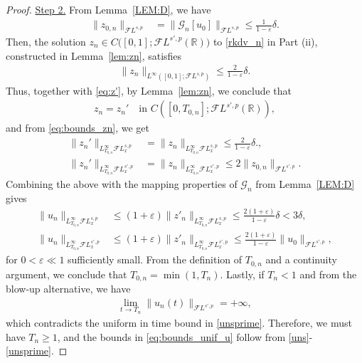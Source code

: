 \documentclass[a4paper,
11pt,  reqno]{amsart}
\newcommand{\5}{\textup{V}}
\newcommand{\FL}{\mathcal{F} L}
\newcommand{\dl}{\delta}
\newcommand{\eps}{\varepsilon}
\theoremstyle{remark}
\newcommand{\R}{\mathbb{R}}
\newcommand{\Gc}{\mathcal{G}}
\numberwithin{equation}{section}
\numberwithin{theorem}{section}
\begin{document}
\begin{proof}
\smallskip
\noindent\underline{Step 2.} From Lemma~\ref{LEM:D}, we have
\begin{align}
\| z_{0,n} \|_{\FL^{s,p}} &  = \| \Gc_n [ u_0] \|_{\FL^{s,p}} \le \tfrac{1}{1-\eps} \dl.
\end{align}
Then,
the solution $z_n \in C\big( [0,1]; \FL^{s',p}(\R)\big)$ to \eqref{rkdv_n} in Part (ii), constructed in Lemma~\ref{lem:zn}, satisfies
\begin{align}
\| z_n \|_{L^\infty([0,1]; \FL^{s,p})} \le \tfrac{2}{1-\eps} \dl
.
\end{align}
Thus, together with \eqref{eq:z'}, by Lemma~\ref{lem:zn}, we conclude that
\begin{align}
z_n = z_n'
\quad
\text{in }
C([0,T_{0,n}]; \FL^{s',p}(\R)),
\end{align}
and from \eqref{eq:bounds_zn}, we get
\begin{align}
\| z_n'\|_{L^\infty_{T_{0,n}} \FL^{s,p}_x}
&=
\| z_n \|_{L^\infty_{T_{0,n}} \FL^{s,p}_x} \le \tfrac{2}{1-\eps}\dl.
,
\\
\| z_n'\|_{L^\infty_{T_{0,n}} \FL^{s',p}_x}
&=
\| z_n \|_{L^\infty_{T_{0,n}} \FL^{s',p}_x} \le 2 \|z_{0,n} \|_{\FL^{s',p}}.
\end{align}
Combining the above with the mapping properties of $\Gc_n$ from Lemma~\ref{LEM:D} gives
\begin{align}
\| u_n \|_{L^\infty_{T_{0,n}} \FL^{s,p}_x}
&
\le (1+\eps)
\| z'_n \|_{L^\infty_{T_{0,n}} \FL^{s,p}_x}
\le
\tfrac{2(1+\eps)}{1-\eps} \dl
< 3 \dl,
\label{uns}
\\
\| u_n \|_{L^\infty_{T_{0,n}} \FL^{s',p}_x}
& \le (1+\eps)
\| z'_n \|_{L^\infty_{T_{0,n}} \FL^{s',p}_x}
\le \tfrac{2 (1+\eps) }{1-\eps} \|u_0 \|_{\FL^{s',p}},
\label{unsprime}
\end{align}
for $0< \eps\ll 1 $ sufficiently small.
From the definition of $T_{0,n}$ and a continuity argument, we conclude that $T_{0,n} = \min(1, T_n)$.
Lastly,
if $T_n < 1$ and from the blow-up alternative, we have
\begin{align}
\lim_{t \to T_n} \| u_n(t) \|_{\FL^{s',p}} = +\infty,
\end{align}
which contradicts the uniform in time bound in \eqref{unsprime}. Therefore, we must have $T_n \ge 1$, and the bounds in \eqref{eq:bounds_unif_u} follow from \eqref{uns}-\eqref{unsprime}.







\end{proof}
\end{document}
